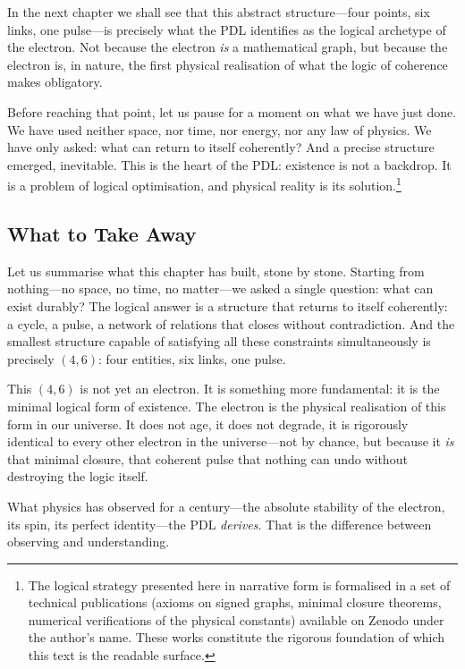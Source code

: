 \documentclass[12pt, a4paper, openright]{book}
\begin{document}
\medskip

In the next chapter we shall see that this abstract structure---four points, six links, one pulse---is precisely what the PDL identifies as the logical archetype of the electron. Not because the electron \emph{is} a mathematical graph, but because the electron is, in nature, the first physical realisation of what the logic of coherence makes obligatory.

\medskip

Before reaching that point, let us pause for a moment on what we have just done. We have used neither space, nor time, nor energy, nor any law of physics. We have only asked: what can return to itself coherently? And a precise structure emerged, inevitable. This is the heart of the PDL: existence is not a backdrop. It is a problem of logical optimisation, and physical reality is its solution.\footnote{The logical strategy presented here in narrative form is formalised in a set of technical publications (axioms on signed graphs, minimal closure theorems, numerical verifications of the physical constants) available on Zenodo under the author's name. These works constitute the rigorous foundation of which this text is the readable surface.}

\subsection*{What to Take Away}

Let us summarise what this chapter has built, stone by stone. Starting from nothing---no space, no time, no matter---we asked a single question: what can exist durably? The logical answer is a structure that returns to itself coherently: a cycle, a pulse, a network of relations that closes without contradiction. And the smallest structure capable of satisfying all these constraints simultaneously is precisely $(4,6)$: four entities, six links, one pulse.

\medskip

This $(4,6)$ is not yet an electron. It is something more fundamental: it is the minimal logical form of existence. The electron is the physical realisation of this form in our universe. It does not age, it does not degrade, it is rigorously identical to every other electron in the universe---not by chance, but because it \emph{is} that minimal closure, that coherent pulse that nothing can undo without destroying the logic itself.

\medskip

What physics has observed for a century---the absolute stability of the electron, its spin, its perfect identity---the PDL \emph{derives}. That is the difference between observing and understanding. 
\end{document}
